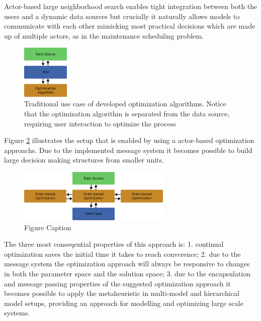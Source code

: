 \documentclass[preprint,12pt,authoryear]{elsarticle}
\begin{document}
Actor-based large neighborhood search enables tight integration between both the users and a 
dynamic data sources but crucially it naturally allows models to communicate with each other mimicking most 
practical decisions which are made up of multiple actors, as in the maintenance scheduling problem.

\begin{figure}[H]%
\centering%
\includegraphics[width=0.2\textwidth]{figures/normal-setup.pdf}
\caption{Traditional use case of developed optimization algorithms. Notice that the optimization algorithm is separated from the data source, requiring user interaction to optimize the process}
\label{fig:normal-setup}
\end{figure}

Figure \ref{fig:actor-setup} illustrates the setup that is enabled by using a actor-based optimization approachs. Due to the implemented message system it becomes possible 
to build large decision making structures from smaller units. 
\begin{figure}[H]%
\centering%
\includegraphics[width=0.65\textwidth]{figures/actor-setup.pdf}
\caption{Figure Caption}\label{fig:actor-setup}
\end{figure}

The three most conseqential properties of this approach is: 1. continual optimization saves the initial time it takes to reach converence; 2. due to the message system the 
optimization approach will always be responsive to changes in both the parameter space
and the solution space; 3. due to the encapsulation and message passing properties of the suggested optimization approach it becomes possible to apply the metaheuristic in multi-model 
and hierarchical model setups, providing an
approach for modelling and optimizing large scale systems. 
\end{document}
